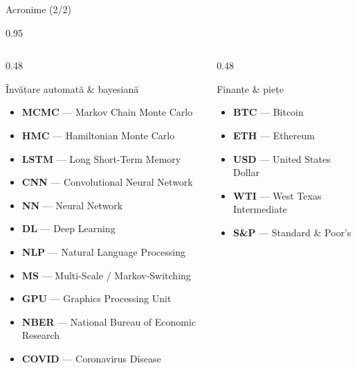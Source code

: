 \documentclass[9pt, aspectratio=169, t]{beamer}
\begin{document}
\begin{frame}{Acronime (2/2)}
    \begin{cminipage}{0.95\textwidth}
    {\scriptsize
    \begin{columns}[T]
        \begin{column}{0.48\textwidth}
            \begin{block}{Învățare automată \& bayesiană}
                \begin{itemize}\setlength{\itemsep}{0pt}
                    \item \textbf{MCMC} --- Markov Chain Monte Carlo
                    \item \textbf{HMC} --- Hamiltonian Monte Carlo
                    \item \textbf{LSTM} --- Long Short-Term Memory
                    \item \textbf{CNN} --- Convolutional Neural Network
                    \item \textbf{NN} --- Neural Network
                    \item \textbf{DL} --- Deep Learning
                    \item \textbf{NLP} --- Natural Language Processing
                    \item \textbf{MS} --- Multi-Scale / Markov-Switching
                    \item \textbf{GPU} --- Graphics Processing Unit
                    \item \textbf{NBER} --- National Bureau of Economic Research
                    \item \textbf{COVID} --- Coronavirus Disease
                \end{itemize}
            \end{block}
        \end{column}
        \begin{column}{0.48\textwidth}
            \begin{alertblock}{Finanțe \& piețe}
                \begin{itemize}\setlength{\itemsep}{0pt}
                    \item \textbf{BTC} --- Bitcoin
                    \item \textbf{ETH} --- Ethereum
                    \item \textbf{USD} --- United States Dollar
                    \item \textbf{WTI} --- West Texas Intermediate
                    \item \textbf{S\&P} --- Standard \& Poor's

\end{itemize}
\end{alertblock}
\end{column}
\end{columns}}
\end{cminipage}
\end{frame}
\end{document}
